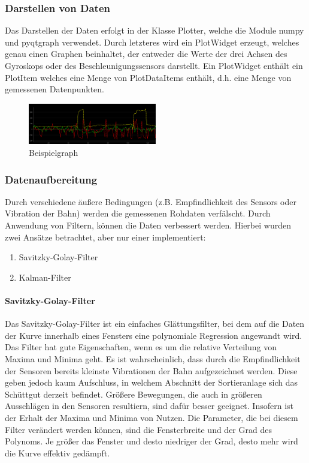 \subsubsection{Darstellen von Daten}
Das Darstellen der Daten erfolgt in der Klasse Plotter, welche die Module numpy und pyqtgraph verwendet. Durch letzteres wird ein PlotWidget erzeugt, welches genau einen Graphen beinhaltet, der entweder die Werte der drei Achsen des Gyroskops oder des Beschleunigungssensors darstellt.
Ein PlotWidget enthält ein PlotItem welches eine Menge von PlotDataItems enthält, d.h. eine Menge von gemessenen Datenpunkten.
\begin{figure}[h]
	\centering
	\includegraphics[width=0.5\textwidth]{images/k3_4-graph.png}
	\caption {Beispielgraph}
	\label{fig:k3_4-graph.png} 
\end{figure}
\subsubsection{Datenaufbereitung}
Durch verschiedene äußere Bedingungen (z.B. Empfindlichkeit des Sensors oder Vibration der Bahn) werden die gemessenen Rohdaten verfälscht. Durch Anwendung von Filtern, können die Daten verbessert werden.
Hierbei wurden zwei Ansätze betrachtet, aber nur einer implementiert:
\begin{enumerate}
\item Savitzky-Golay-Filter
\item Kalman-Filter
\end{enumerate}
\paragraph{Savitzky-Golay-Filter}
Das Savitzky-Golay-Filter ist ein einfaches Glättungsfilter, bei dem auf die Daten der Kurve innerhalb eines Fensters eine polynomiale Regression angewandt wird. Das Filter hat gute Eigenschaften, wenn es um die relative Verteilung von Maxima und Minima geht. Es ist wahrscheinlich, dass durch die Empfindlichkeit der Sensoren bereits kleinste Vibrationen der Bahn aufgezeichnet werden. Diese geben jedoch kaum Aufschluss, in welchem Abschnitt der Sortieranlage sich das Schüttgut derzeit befindet. Größere Bewegungen, die auch in größeren Ausschlägen in den Sensoren resultiern, sind dafür besser geeignet. Insofern ist der Erhalt der Maxima und Minima von Nutzen.
Die Parameter, die bei diesem Filter verändert werden können, sind die Fensterbreite und der Grad des Polynoms. Je größer das Fenster und desto niedriger der Grad, desto mehr wird die Kurve effektiv gedämpft.
